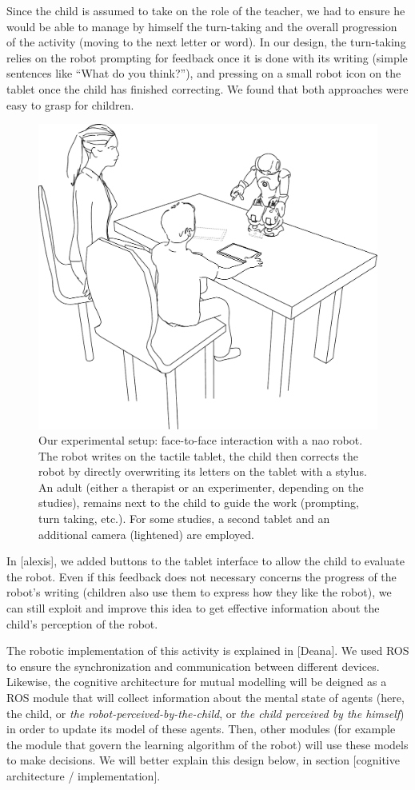 \documentclass[10pt,a4paper,twocolumn]{article}
\begin{document}
Since the child is assumed to take on the role of the teacher, we had to ensure
he would be able to manage by himself the turn-taking and the overall
progression of the activity (moving to the next letter or word). In our design,
the turn-taking relies on the robot prompting for feedback once it is done with
its writing (simple sentences like ``What do you think?''), and pressing on a
small robot icon on the tablet once the child has finished correcting. We found that both approaches were easy to grasp for children.


   \begin{figure}
       \centering
       \includegraphics[width=0.6\columnwidth]{experimental_setup}
       \caption{\small Our experimental setup: face-to-face interaction with a {\sc
           nao} robot.  The robot writes on the tactile tablet, the child then
           corrects the robot by directly overwriting its letters on the tablet
           with a stylus. An adult (either a therapist or an experimenter,
           depending on the studies), remains next to the child to guide the work
           (prompting, turn taking, etc.). For some studies, a second tablet and an
           additional camera (lightened) are employed.}

       \label{experimental_setup}
   \end{figure}
   
In [alexis], we added buttons to the tablet interface to allow the child to evaluate the robot. Even if this feedback does not necessary concerns the progress of the robot's writing (children also use them to express how they like the robot), we can still exploit and improve this idea to get effective information about the child's perception of the robot.
   
The robotic implementation of this activity is explained in [Deana]. We used ROS to ensure the synchronization and communication between different devices. Likewise, the cognitive architecture for mutual modelling will be deigned as a ROS module that will collect information about the mental state of agents (here, the child, or \textit{the robot-perceived-by-the-child}, or \textit{the child perceived by the himself}) in order to update its model of these agents. Then, other modules (for example the module that govern the learning algorithm of the robot) will use these models to make decisions. We will better explain this design below, in section [cognitive architecture / implementation].
\end{document}
